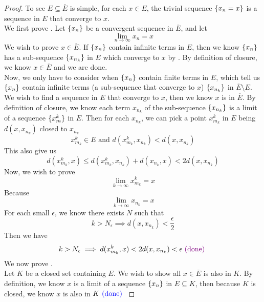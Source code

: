 \documentclass{report}
\begin{document}
\begin{proof}
To see $E\subseteq \overline{E}$ is simple, for each $x\in E$, the trivial sequence $\{ x_n=x \}$ is a sequence in $E$ that converge to $x$.\\

We first prove . Let $\{ x_n \}$ be a convergent sequence in $\overline{E}$, and let
\begin{equation}
\lim_{n\to\infty} x_n=x
\end{equation}
We wish to prove $x\in \overline{E}$. If $\{ x_n \}$ contain infinite terms in $E$, then we know $\{ x_n \}$ has a sub-sequence $\{ x_{n_k} \}$ in $E$ which converge to $x$ by  . By definition of closure, we know $x\in \overline{E}$ and we are done.\\

Now, we only have to consider when $\{ x_n \}$ contain finite terms in $E$, which tell us $\{ x_n \}$ contain infinite terms (a sub-sequence that converge to $x$) $\{ x_{n_k} \}$ in $\overline{E}\setminus E$.\\

We wish to find a sequence in $E$ that converge to  $x$, then we know  $x$ is in $\overline{E}$. By definition of closure, we know each term $x_{n_k}$ of the sub-sequence $\{ x_{n_k} \}$ is a limit of a sequence $\{ x^k_m \}$ in $E$. Then for each $x_{n_k}$, we can pick a point $x^k_{m_k}$ in $E$ being $d(x,x_{n_k})$ closed to $x_{n_k}$ 
\begin{equation}
x_{m_k}^k\in E\text{ and }d(x^k_{m_k},x_{n_k})<d(x,x_{n_k})
\end{equation}
This also give us
\begin{equation}
d(x_{m_k}^k,x)\leq d(x_{m_k}^k,x_{n_k})+d(x_{n_k},x)<2d(x,x_{n_k})
\end{equation}
Now, we wish to prove 
\begin{equation}
\lim_{k\to\infty}x^k_{m_k}=x
\end{equation}
Because
\begin{equation}
\lim_{k\to\infty}x_{n_k}=x
\end{equation}
For each small $\epsilon $, we know there exists $N$ such that
\begin{equation}
k>N_\epsilon \implies d(x,x_{n_k})<\frac{\epsilon}{2} 
\end{equation}
Then we have
\begin{equation}
k>N_\epsilon \implies d(x^k_{m_k},x)<2d(x,x_{n_k})<\epsilon \textcolor{violet}{\text{ (done) }}
\end{equation}
We now prove .\\ 

Let $K$ be a closed set containing  $E$. We wish to show all $x\in \overline{E}$ is also in $K$. By definition, we know  $x$ is a limit of a sequence  $\{ x_n \}$ in $E\subseteq K$, then because $K$ is closed, we know $x$ is also in $K\textcolor{blue}{\text{ (done) }}$  
\end{proof}
\end{document}

